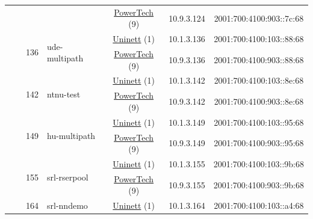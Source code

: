 \begin{small}
\begin{center}
\begin{longtable}{|c|c|c|c|c|c|c|c|}
  &  &  &  & \multicolumn{2}{|c|}{\tiny{\href{http://www.powertech.no}{PowerTech} (9)}} & \tiny{10.9.3.124} & \tiny{2001:700:4100:903::7c:68} \\* \cline{3-3}\cline{4-4}\cline{5-5}\cline{6-6}\cline{7-7}\cline{8-8}
  &  & \multirow{2}{*}{\tiny{136}} & \multicolumn{1}{|l|}{\multirow{2}{*}{\tiny{ude-multipath}}} & \multicolumn{2}{|c|}{\tiny{\href{https://www.uninett.no}{Uninett} (1)}} & \tiny{10.1.3.136} & \tiny{2001:700:4100:103::88:68} \\* \cline{5-5}\cline{6-6}\cline{7-7}\cline{8-8}
  &  &  &  & \multicolumn{2}{|c|}{\tiny{\href{http://www.powertech.no}{PowerTech} (9)}} & \tiny{10.9.3.136} & \tiny{2001:700:4100:903::88:68} \\* \cline{3-3}\cline{4-4}\cline{5-5}\cline{6-6}\cline{7-7}\cline{8-8}
  &  & \multirow{2}{*}{\tiny{142}} & \multicolumn{1}{|l|}{\multirow{2}{*}{\tiny{ntnu-test}}} & \multicolumn{2}{|c|}{\tiny{\href{https://www.uninett.no}{Uninett} (1)}} & \tiny{10.1.3.142} & \tiny{2001:700:4100:103::8e:68} \\* \cline{5-5}\cline{6-6}\cline{7-7}\cline{8-8}
  &  &  &  & \multicolumn{2}{|c|}{\tiny{\href{http://www.powertech.no}{PowerTech} (9)}} & \tiny{10.9.3.142} & \tiny{2001:700:4100:903::8e:68} \\* \cline{3-3}\cline{4-4}\cline{5-5}\cline{6-6}\cline{7-7}\cline{8-8}
  &  & \multirow{2}{*}{\tiny{149}} & \multicolumn{1}{|l|}{\multirow{2}{*}{\tiny{hu-multipath}}} & \multicolumn{2}{|c|}{\tiny{\href{https://www.uninett.no}{Uninett} (1)}} & \tiny{10.1.3.149} & \tiny{2001:700:4100:103::95:68} \\* \cline{5-5}\cline{6-6}\cline{7-7}\cline{8-8}
  &  &  &  & \multicolumn{2}{|c|}{\tiny{\href{http://www.powertech.no}{PowerTech} (9)}} & \tiny{10.9.3.149} & \tiny{2001:700:4100:903::95:68} \\* \cline{3-3}\cline{4-4}\cline{5-5}\cline{6-6}\cline{7-7}\cline{8-8}
  &  & \multirow{2}{*}{\tiny{155}} & \multicolumn{1}{|l|}{\multirow{2}{*}{\tiny{srl-rserpool}}} & \multicolumn{2}{|c|}{\tiny{\href{https://www.uninett.no}{Uninett} (1)}} & \tiny{10.1.3.155} & \tiny{2001:700:4100:103::9b:68} \\* \cline{5-5}\cline{6-6}\cline{7-7}\cline{8-8}
  &  &  &  & \multicolumn{2}{|c|}{\tiny{\href{http://www.powertech.no}{PowerTech} (9)}} & \tiny{10.9.3.155} & \tiny{2001:700:4100:903::9b:68} \\* \cline{3-3}\cline{4-4}\cline{5-5}\cline{6-6}\cline{7-7}\cline{8-8}
  &  & \multirow{2}{*}{\tiny{164}} & \multicolumn{1}{|l|}{\multirow{2}{*}{\tiny{srl-nndemo}}} & \multicolumn{2}{|c|}{\tiny{\href{https://www.uninett.no}{Uninett} (1)}} & \tiny{10.1.3.164} & \tiny{2001:700:4100:103::a4:68} \\* \cline{5-5}\cline{6-6}\cline{7-7}\cline{8-8}

\end{longtable}
\end{center}
\end{small}
